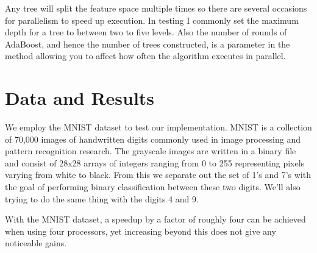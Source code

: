 \documentclass[12pt]{article}
\begin{document}


Any tree will split the feature space multiple times so
there are several occasions for parallelism to speed up execution. In testing I
commonly set the maximum depth for a tree to between two to five levels. Also
the number of rounds of AdaBoost, and hence the number of trees constructed, is
a parameter in the method allowing you to affect how often the algorithm executes in parallel.



\section{Data and Results}
We employ the MNIST dataset to test our implementation. MNIST is a collection of 70,000 images of handwritten digits commonly used in image processing and pattern recognition research. The grayscale images are written in a binary file and consist of 28x28 arrays of integers ranging from 0 to 255 representing pixels varying from white to black. From this we separate out the set of 1's and 7's with the goal of performing binary classification between these two digits. We'll also trying to do the same thing with the digits 4 and 9. 


With the MNIST dataset, a speedup by a factor of roughly four can be achieved
when using four processors, yet increasing beyond this does not give any
noticeable gains.
\end{document}
